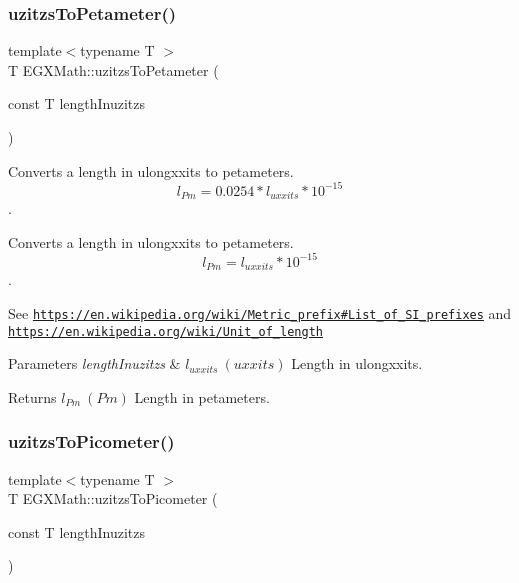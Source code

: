 \subsubsection{\texorpdfstring{uzitzs\+To\+Petameter()}{uzitzsToPetameter()}}
{\footnotesize\ttfamily template$<$typename T $>$ \\
T E\+G\+X\+Math\+::uzitzs\+To\+Petameter (\begin{DoxyParamCaption}\item[{const T}]{length\+Inuzitzs }\end{DoxyParamCaption})}



Converts a length in ulongxxits to petameters. \[ l_{Pm}=0.0254 * l_{uxxits} * 10^{-15} \]. 

Converts a length in ulongxxits to petameters. \[ l_{Pm}=l_{uxxits} * 10^{-15} \].

See \href{https://en.wikipedia.org/wiki/Metric_prefix#List_of_SI_prefixes}{\tt https\+://en.\+wikipedia.\+org/wiki/\+Metric\+\_\+prefix\#\+List\+\_\+of\+\_\+\+S\+I\+\_\+prefixes} and \href{https://en.wikipedia.org/wiki/Unit_of_length}{\tt https\+://en.\+wikipedia.\+org/wiki/\+Unit\+\_\+of\+\_\+length} 
\begin{DoxyParams}{Parameters}
{\em length\+Inuzitzs} & $ l_{uxxits}\ (uxxits)$ Length in ulongxxits. \\
\hline
\end{DoxyParams}
\begin{DoxyReturn}{Returns}
$ l_{Pm}\ (Pm)$ Length in petameters. 
\end{DoxyReturn}
\mbox{\label{group___e_g_x_math-_conversions-_length_conversions-_imperial-uzitzs-_s_i_ga48c60a4876ac426d1717096263648a4d}} 
\subsubsection{\texorpdfstring{uzitzs\+To\+Picometer()}{uzitzsToPicometer()}}
{\footnotesize\ttfamily template$<$typename T $>$ \\
T E\+G\+X\+Math\+::uzitzs\+To\+Picometer (\begin{DoxyParamCaption}\item[{const T}]{length\+Inuzitzs }\end{DoxyParamCaption})}



